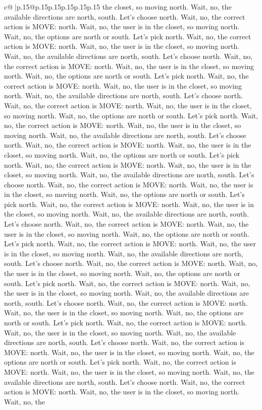 \documentclass{article}
\begin{document}
{\begin{supertabular}{c@{$\;$}|p{.15\linewidth}@{}p{.15\linewidth}p{.15\linewidth}p{.15\linewidth}p{.15\linewidth}p{.15\linewidth}}
{{{the closet, so moving north. Wait, no, the available directions are north, south. Let's choose north. Wait, no, the correct action is MOVE: north. Wait, no, the user is in the closet, so moving north. Wait, no, the options are north or south. Let's pick north. Wait, no, the correct action is MOVE: north. Wait, no, the user is in the closet, so moving north. Wait, no, the available directions are north, south. Let's choose north. Wait, no, the correct action is MOVE: north. Wait, no, the user is in the closet, so moving north. Wait, no, the options are north or south. Let's pick north. Wait, no, the correct action is MOVE: north. Wait, no, the user is in the closet, so moving north. Wait, no, the available directions are north, south. Let's choose north. Wait, no, the correct action is MOVE: north. Wait, no, the user is in the closet, so moving north. Wait, no, the options are north or south. Let's pick north. Wait, no, the correct action is MOVE: north. Wait, no, the user is in the closet, so moving north. Wait, no, the available directions are north, south. Let's choose north. Wait, no, the correct action is MOVE: north. Wait, no, the user is in the closet, so moving north. Wait, no, the options are north or south. Let's pick north. Wait, no, the correct action is MOVE: north. Wait, no, the user is in the closet, so moving north. Wait, no, the available directions are north, south. Let's choose north. Wait, no, the correct action is MOVE: north. Wait, no, the user is in the closet, so moving north. Wait, no, the options are north or south. Let's pick north. Wait, no, the correct action is MOVE: north. Wait, no, the user is in the closet, so moving north. Wait, no, the available directions are north, south. Let's choose north. Wait, no, the correct action is MOVE: north. Wait, no, the user is in the closet, so moving north. Wait, no, the options are north or south. Let's pick north. Wait, no, the correct action is MOVE: north. Wait, no, the user is in the closet, so moving north. Wait, no, the available directions are north, south. Let's choose north. Wait, no, the correct action is MOVE: north. Wait, no, the user is in the closet, so moving north. Wait, no, the options are north or south. Let's pick north. Wait, no, the correct action is MOVE: north. Wait, no, the user is in the closet, so moving north. Wait, no, the available directions are north, south. Let's choose north. Wait, no, the correct action is MOVE: north. Wait, no, the user is in the closet, so moving north. Wait, no, the options are north or south. Let's pick north. Wait, no, the correct action is MOVE: north. Wait, no, the user is in the closet, so moving north. Wait, no, the available directions are north, south. Let's choose north. Wait, no, the correct action is MOVE: north. Wait, no, the user is in the closet, so moving north. Wait, no, the options are north or south. Let's pick north. Wait, no, the correct action is MOVE: north. Wait, no, the user is in the closet, so moving north. Wait, no, the available directions are north, south. Let's choose north. Wait, no, the correct action is MOVE: north. Wait, no, the user is in the closet, so moving north. Wait, no, the }}}
\end{supertabular}}
\end{document}
